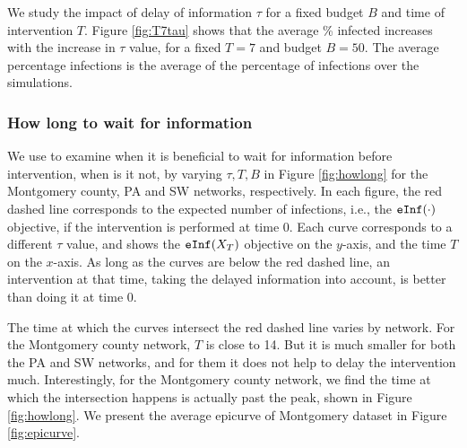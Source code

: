 We study the impact of delay of information $\tau$ for a fixed budget $B$ and time of intervention $T$. Figure \ref{fig:T7tau} shows that the average \% infected increases with the increase in $\tau$ value, for a fixed $T = 7$ and budget $B=50$. The average percentage infections is the average of the percentage of infections over the simulations.




\subsubsection{How long to wait for information}
We use \algodelay{} to examine when it is beneficial to wait for information before intervention, when is it not, by varying $\tau, T, B$ in Figure \ref{fig:howlong} for the Montgomery county, PA and SW networks, respectively. In each figure,
the red dashed line corresponds to the expected number of infections, i.e., the $\texttt{eInf}(\cdot)$ objective, if the intervention is performed at time $0$. Each curve corresponds to a different $\tau$ value, and shows the $\texttt{eInf}(X_T)$ objective on the $y$-axis, and the time $T$ on the $x$-axis. As long as the curves are below the red dashed line, an intervention at that time, taking the delayed information into account, is better than doing it at time $0$.

The time at which the curves intersect the red dashed line varies by network. For the Montgomery county network, $T$ is close to 14. But it is much smaller for both the PA and SW networks, and for them it does not help to delay the intervention much. Interestingly, for the Montgomery county network, we find the time at which the intersection happens is actually past the peak, shown in Figure \ref{fig:howlong}. We present the average epicurve of Montgomery dataset in Figure \ref{fig:epicurve}.



